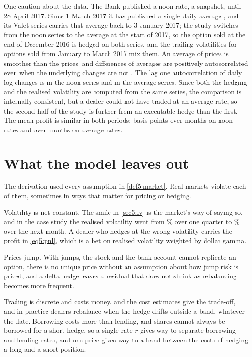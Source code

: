 \begin{chapterrefs}
One caution about the data. The Bank published a noon rate, a snapshot, until 28 April 2017. Since
1 March 2017 it has published a single daily average \parencite{bocfxchange}, and its Valet series
carries that average back to 3 January 2017; the study switches from the noon series to the average
at the start of 2017, so the option sold at the end of December 2016 is hedged on both series, and the
trailing volatilities for options sold from January to March 2017 mix them. An average of prices is smoother than the prices, and differences
of averages are positively autocorrelated even when the underlying changes are not \parencite{working1960}.
The lag one autocorrelation of daily log changes is \acRetNoon{} in the noon series and \acRetAvg{} in
the average series. Since both the hedging and the realised volatility are computed from the same
series, the comparison is internally consistent, but a dealer could not have traded at an average
rate, so the second half of the study is further from an executable hedge than the first. The
mean profit is similar in both periods: \fxPnlMeanNoon{} basis points over \fxNNoon{} months on noon
rates and \fxPnlMeanAvg{} over \fxNAvg{} months on average rates.

\section{What the model leaves out}
\label{sec5:limits}

The derivation used every assumption in \cref{def5:market}. Real markets violate each of them, sometimes
in ways that matter for pricing or hedging.

Volatility is not constant. The smile in \cref{sec5:iv} is the market's way of saying so, and in the
case study the realised volatility went from \fxWorstSh\% over one quarter to \fxWorstSr\% over the
next month. A dealer who hedges at
the wrong volatility carries the profit in \cref{eq5:pnl}, which is a bet on realised volatility weighted
by dollar gamma.

Prices jump. With jumps, the stock and the bank account cannot replicate an option, there is no unique
price without an assumption about how jump risk is priced, and a delta hedge leaves a residual that
does not shrink as rebalancing becomes more frequent.

Trading is discrete and costs money.  and the cost estimates give the trade-off,
and in practice dealers rebalance when the hedge drifts outside a band, whatever the date. Borrowing costs more than lending,
and shares cannot always be borrowed for a short hedge, so a single rate $r$ gives way to separate
borrowing and lending rates, and one price gives way to a band between the costs of hedging a long and
a short position.


\end{chapterrefs}
